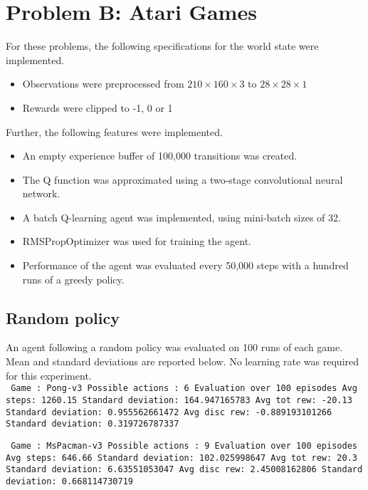 \documentclass[paper=a4, fontsize=11pt]{scrartcl} %
\numberwithin{equation}{section} %
\numberwithin{figure}{section} %
\numberwithin{table}{section} %
\begin{document}
\section{Problem B: Atari Games}
For these problems, the following specifications for the world state were implemented.
\begin{itemize}
\item Observations were preprocessed from $210 \times 160 \times 3$ to $28 \times 28 \times 1$
\item Rewards were clipped to -1, 0 or 1
\end{itemize}
Further, the following features were implemented.
\begin{itemize}
\item An empty experience buffer of 100,000 transitions was created.
\item The Q function was approximated using a two-stage convolutional neural network.
\item A batch Q-learning agent was implemented, using mini-batch sizes of 32.
\item RMSPropOptimizer was used for training the agent.
\item Performance of the agent was evaluated every 50,000 steps with a hundred runs of a greedy policy.
\end{itemize}

\subsection{Random policy}
An agent following a random policy was evaluated on 100 runs of each game. Mean and standard deviations are reported below. No learning rate was required for this experiment.\\

\texttt{
Game : Pong-v3 \newline
Possible actions : 6 \newline
Evaluation over 100 episodes \newline
Avg steps: 1260.15 \quad\quad\quad\quad\quad\quad\quad  Standard deviation: 164.947165783 \newline
Avg tot rew: -20.13 \quad\quad\quad\quad\quad\quad\quad  Standard deviation: 0.955562661472 \newline
Avg disc rew: -0.889193101266 \quad\quad Standard deviation: 0.319726787337 \newline
}

\texttt{
Game : MsPacman-v3 \newline
Possible actions : 9 \newline
Evaluation over 100 episodes \newline
Avg steps: 646.66 \quad\quad\quad\quad\quad\quad\quad\quad  Standard deviation: 102.025998647 \newline
Avg tot rew: 20.3 \quad\quad\quad\quad\quad\quad\quad\quad Standard deviation: 6.63551053047 \newline
Avg disc rew: 2.45008162806 \quad\quad\quad  Standard deviation: 0.668114730719\newline
}
\end{document}
